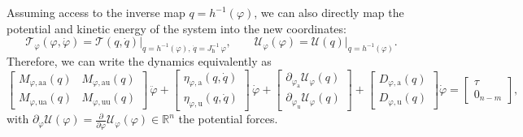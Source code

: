 Assuming access to the inverse map $q = h^{-1}(\varphi)$, we can also directly map the potential and kinetic energy of the system into the new coordinates:
\begin{equation}
    \mathcal{T}_\varphi(\varphi, \dot{\varphi}) = \mathcal{T}\left ( q, \dot{q} \right ) \big |_{q=h^{-1}(\varphi), \, \dot{q}=J_\mathrm{h}^{-1} \, \varphi},
    \qquad
    \mathcal{U}_\varphi(\varphi) = \mathcal{U}\left ( q \right ) \big |_{q=h^{-1}(\varphi)}.
\end{equation}
Therefore, we can write the dynamics equivalently as
\begin{equation}
    \begin{bmatrix}
        M_{\varphi,\mathrm{aa}}(q) & M_{\varphi,\mathrm{au}}(q)\\ 
        M_{\varphi,\mathrm{ua}}(q) & M_{\varphi,\mathrm{uu}}(q)
    \end{bmatrix} \, \ddot{\varphi} + \begin{bmatrix}
        \eta_{\varphi,\mathrm{a}}(q,\dot{q})\\ \eta_{\varphi,\mathrm{u}}(q,\dot{q})
    \end{bmatrix} \, \dot{\varphi} + \begin{bmatrix}
        \partial_{\varphi_\mathrm{a}} \mathcal{U}_\varphi(q)\\
        \partial_{\varphi_\mathrm{u}} \mathcal{U}_\varphi(q)
    \end{bmatrix} + \begin{bmatrix}
        D_{\varphi,\mathrm{a}}(q)\\
        D_{\varphi,\mathrm{u}}(q)
    \end{bmatrix} \dot{\varphi} = \begin{bmatrix}
        \tau\\ 0_{n-m}
    \end{bmatrix},
\end{equation}
with $\partial_\varphi \mathcal{U}(\varphi) = \frac{\partial }{\partial \varphi}  \mathcal{U}_\varphi(\varphi) \in \mathbb{R}^n$ the potential forces.

